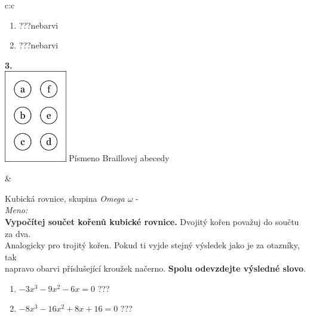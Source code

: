 \documentclass[10pt]{report}
\begin{document}
\begin{tabular}{c:c}
\begin{minipage}[c][99mm][t]{0.49\linewidth}
\begin{center}
\begin{minipage}{0.77\linewidth}
\begin{center}
\begin{varwidth}{\textwidth}
\begin{enumerate}
\item \quad \dotfill\; ???\;\dotfill \quad nebarvi
\item \quad \dotfill\; ???\;\dotfill \quad nebarvi
\end{enumerate}
\end{varwidth}
\end{center}
\end{minipage}
\begin{minipage}{0.20\linewidth}
\begin{center}
{\Huge\bfseries 3.} \\[2mm]
\includegraphics[height=40mm]{../images/braille.png}
{\small Písmeno Braillovej abecedy}
\end{center}
\end{minipage}
\end{center}
\end{minipage}
&
\begin{minipage}[c][99mm][t]{0.49\linewidth}
\begin{center}
\vspace{7mm}
{\huge Kubická rovnice, skupina \textit{Omega $\omega$} -}\\[4.5mm]
\textit{Meno:}\phantom{xxxxxxxxxxxxxxxxxxxxxxxxxxxxxxxxxxxxxxxxxxxxxxxxxxxxxxxxxxxxxxxxx}\\[3.5mm]
\textbf{Vypočítej součet kořenů kubické rovnice.} Dvojitý kořen považuj do součtu za dva.\\Analogicky pro trojitý kořen. Pokud ti vyjde stejný výsledek jako je za otazníky, tak\\napravo obarvi příslušející kroužek načerno. \textbf{Spolu odevzdejte výsledné slovo}.\\[3mm]
\begin{minipage}{0.77\linewidth}
\begin{center}
\begin{varwidth}{\textwidth}
\begin{enumerate}
\large
\item $-3x^3-9x^2-6x=0$\quad \dotfill\; ???\;\dotfill {}
\item $-8x^3-16x^2+8x+16=0$\quad \dotfill\; ???\;\dotfill {}

\end{enumerate}
\end{varwidth}
\end{center}
\end{minipage}
\end{center}
\end{minipage}
\end{tabular}
\end{document}
